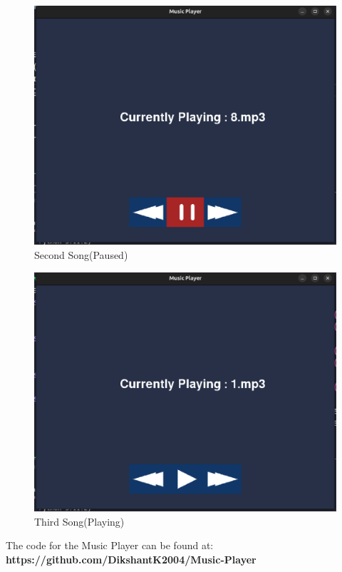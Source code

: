\documentclass{article}
\begin{document}
\begin{figure}[h!]
        \includegraphics[scale = 0.25]{figs/img2}
        \caption{Second Song(Paused)}
        \label{fig:2}
\end{figure}

\begin{figure}[h!]
       \includegraphics[scale = 0.25]{figs/img3}
        \caption{Third Song(Playing)}
        \label{fig:3}
\end{figure}

The code for the Music Player can be found at:
\textbf{https://github.com/DikshantK2004/Music-Player}
\end{document}
